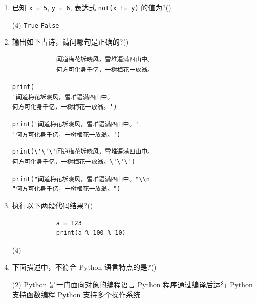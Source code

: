 \documentclass[11pt]{ctexart}
\begin{document}
\begin{enumerate}
        \item 已知 \lstinline{x = 5}, \lstinline{y = 6}, 表达式 \lstinline{not(x != y)} 的值为?(\qquad)
        \begin{tasks}(4)
            \task \lstinline{True}
            \task \lstinline{False}
        \end{tasks}

        \item 输出如下古诗，请问哪句是正确的?(\qquad)
        \begin{lstlisting}
            闻道梅花坼晓风，雪堆遍满四山中。
            何方可化身千亿，一树梅花一放翁。
        \end{lstlisting}
        \begin{tasks}
            \task \lstinline{print(}\\
            \lstinline{'闻道梅花坼晓风，雪堆遍满四山中。}\\
            \lstinline{何方可化身千亿，一树梅花一放翁。')}

            \task \lstinline{print('闻道梅花坼晓风，雪堆遍满四山中。'}\\
            \lstinline{'何方可化身千亿，一树梅花一放翁。')}

            \task \lstinline{print(\'\'\'闻道梅花坼晓风，雪堆遍满四山中。}\\
            \lstinline{何方可化身千亿，一树梅花一放翁。\'\'\')}

            \task \lstinline{print("闻道梅花坼晓风，雪堆遍满四山中。"\\n}\\
            \lstinline{"何方可化身千亿，一树梅花一放翁。")}
        \end{tasks}

        \item 执行以下两段代码结果?(\qquad)
        \begin{lstlisting}
            a = 123
            print(a % 100 % 10)
        \end{lstlisting}
        \begin{tasks}(4)
        \end{tasks}

        \item 下面描述中，不符合 Python 语言特点的是?(\qquad)
        \begin{tasks}(2)
            \task Python 是一门面向对象的编程语言
            \task Python 程序通过编译后运行
            \task Python 支持函数编程
            \task Python 支持多个操作系统
        \end{tasks}


\end{enumerate}
\end{document}
